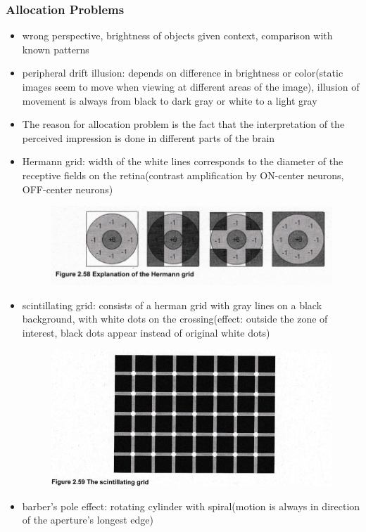 \documentclass{standalone}
\begin{document}
\subsubsection*{Allocation Problems}
\begin{itemize}
	\item wrong perspective, brightness of objects given context, comparison with known patterns
	\item peripheral drift illusion: depends on difference in brightness or color(static images seem to move when viewing at different areas of the image), illusion of movement is always from black to dark gray or white to a light gray
	\item The reason for allocation problem is the fact that the interpretation of the perceived impression is done in different parts of the brain
	\item Hermann grid: width of the white lines corresponds to the diameter of the receptive fields on the retina(contrast amplification by ON-center neurons, OFF-center neurons)
		\begin{figure}[H]
			\centering
			\includegraphics[width = 0.7\linewidth]{Figures/2_58.png}
		\end{figure}
		\item scintillating grid: consists of a herman grid with gray lines on a black background, with white dots on the crossing(effect: outside the zone of interest, black dots appear instead of original white dots)
		\begin{figure}[H]
			\centering
			\includegraphics[width = 0.7\linewidth]{Figures/2_59.png}
		\end{figure}
		\item barber's pole effect: rotating cylinder with spiral(motion is always in direction of the aperture's longest edge)
\end{itemize}
\end{document}
